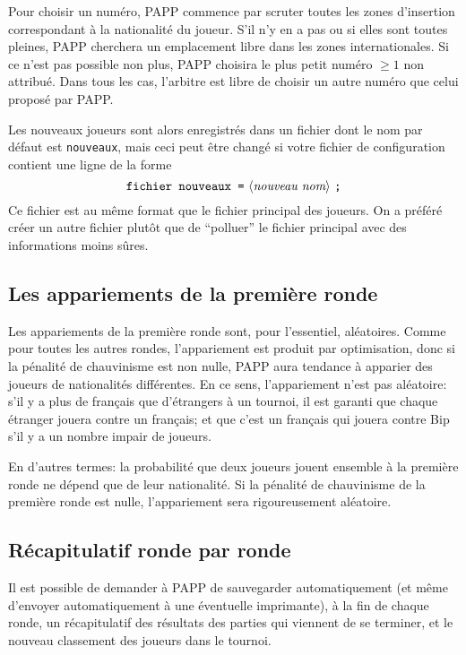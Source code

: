 \documentclass[10pt]{article}
\begin{document}
	Pour choisir un num\'ero, PAPP commence par scruter toutes les
zones d'insertion correspondant \`a la nationalit\'e du joueur. S'il n'y
en a pas ou si elles sont toutes pleines, PAPP cherchera un emplacement
libre dans les zones internationales. Si ce n'est pas possible non plus,
PAPP choisira le plus petit num\'ero $\ge1$ non attribu\'e. Dans tous
les cas, l'arbitre est libre de choisir un autre num\'ero que celui
propos\'e par PAPP.

	Les nouveaux joueurs sont alors enregistr\'es dans un fichier
dont le nom par d\'efaut est \verb|nouveaux|, mais ceci peut \^etre
chang\'e si votre fichier de configuration contient une ligne de la
forme
 $$\hbox{\verb|fichier nouveaux =| \gram{nouveau nom} \verb|;|}$$
Ce fichier est au m\^eme format que le fichier principal des joueurs. On a
pr\'ef\'er\'e cr\'eer un autre fichier plut\^ot que de ``polluer'' le fichier
principal avec des informations moins s\^ures.

\subsection{Les appariements de la premi\`ere ronde}

	Les appariements de la premi\`ere ronde sont, pour l'essentiel,
al\'eatoires.  Comme pour toutes les autres rondes, l'appariement est
produit par optimisation, donc si la p\'enalit\'e de chauvinisme est non
nulle, PAPP aura tendance \`a apparier des joueurs de nationalit\'es
diff\'erentes.  En ce sens, l'appariement n'est pas al\'eatoire: s'il y
a plus de fran{\c c}ais que d'\'etrangers \`a un tournoi, il est garanti
que chaque \'etranger jouera contre un fran{\c c}ais; et que c'est un
fran{\c c}ais qui jouera contre Bip s'il y a un nombre impair de
joueurs. 

	En d'autres termes: la probabilit\'e que deux joueurs jouent
ensemble \`a la premi\`ere ronde ne d\'epend que de leur nationalit\'e. 
Si la p\'enalit\'e de chauvinisme de la premi\`ere ronde est nulle,
l'appariement sera rigoureusement al\'eatoire. 

\subsection{R\'ecapitulatif ronde par ronde}

Il est possible de demander \`a PAPP de sauvegarder automatiquement 
(et m\^eme d'envoyer automatiquement \`a une \'eventuelle imprimante), 
\`a la fin de chaque ronde, un r\'ecapitulatif des r\'esultats des 
parties qui viennent de se terminer, et le nouveau classement des 
joueurs dans le tournoi.
\end{document}
